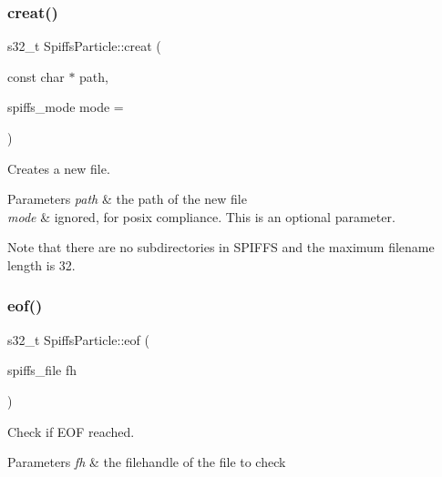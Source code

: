 \subsubsection{\texorpdfstring{creat()}{creat()}}
{\footnotesize\ttfamily s32\+\_\+t Spiffs\+Particle\+::creat (\begin{DoxyParamCaption}\item[{const char $\ast$}]{path,  }\item[{spiffs\+\_\+mode}]{mode = {} }\end{DoxyParamCaption})\hspace{0.3cm}{\ttfamily [inline]}}



Creates a new file. 


\begin{DoxyParams}{Parameters}
{\em path} & the path of the new file \\
\hline
{\em mode} & ignored, for posix compliance. This is an optional parameter.\\
\hline
\end{DoxyParams}
Note that there are no subdirectories in S\+P\+I\+F\+FS and the maximum filename length is 32. \mbox{\label{class_spiffs_particle_abb6a31d8bb30bbe0816e89f8d15cfd9c}} 
\subsubsection{\texorpdfstring{eof()}{eof()}}
{\footnotesize\ttfamily s32\+\_\+t Spiffs\+Particle\+::eof (\begin{DoxyParamCaption}\item[{spiffs\+\_\+file}]{fh }\end{DoxyParamCaption})\hspace{0.3cm}{\ttfamily [inline]}}



Check if E\+OF reached. 


\begin{DoxyParams}{Parameters}
{\em fh} & the filehandle of the file to check \\
\hline
\end{DoxyParams}
\mbox{\label{class_spiffs_particle_a377b6476c59d353cedc0c666a3998af4}} 
